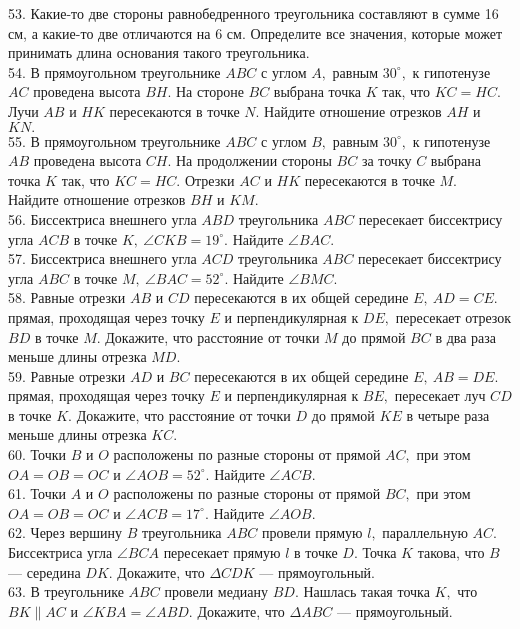 53. Какие-то две стороны равнобедренного треугольника составляют в сумме 16 см, а какие-то две отличаются на 6 см. Определите все значения, которые может принимать длина основания такого треугольника.\\
54. В прямоугольном треугольнике $ABC$ с углом $A,$ равным $30^\circ,$ к гипотенузе $AC$ проведена высота $BH.$ На стороне $BC$ выбрана точка $K$ так, что $KC=HC.$ Лучи $AB$ и $HK$ пересекаются в точке $N.$ Найдите отношение отрезков $AH$ и $KN.$\\
55.  В прямоугольном треугольнике $ABC$ с углом $B,$ равным $30^\circ,$ к гипотенузе $AB$ проведена высота $CH.$ На продолжении стороны $BC$ за точку $C$ выбрана точка $K$ так, что $KC=HC.$ Отрезки $AC$ и $HK$ пересекаются в точке $M.$ Найдите отношение отрезков $BH$ и $KM.$\\
56. Биссектриса внешнего угла $ABD$ треугольника $ABC$ пересекает биссектрису угла $ACB$ в точке $K,\ \angle CKB=19^\circ.$ Найдите $\angle BAC.$\\
57. Биссектриса внешнего угла $ACD$ треугольника $ABC$ пересекает биссектрису угла $ABC$ в точке $M,\ \angle BAC=52^\circ.$ Найдите $\angle BMC.$\\
58. Равные отрезки $AB$ и $CD$ пересекаются в их общей середине $E,\ AD=CE.$ прямая, проходящая через точку $E$ и перпендикулярная к $DE,$ пересекает отрезок $BD$ в точке $M.$ Докажите, что расстояние от точки $M$ до прямой $BC$ в два раза меньше длины отрезка $MD.$\\
59. Равные отрезки $AD$ и $BC$ пересекаются в их общей середине $E,\ AB=DE.$ прямая, проходящая через точку $E$ и перпендикулярная к $BE,$ пересекает луч $CD$ в точке $K.$ Докажите, что расстояние от точки $D$ до прямой $KE$ в четыре раза меньше длины отрезка $KC.$\\
60. Точки $B$ и $O$ расположены по разные стороны от прямой $AC,$ при этом  $OA=OB=OC$ и $\angle AOB = 52^\circ.$ Найдите $\angle ACB.$\\
61. Точки $A$ и $O$ расположены по разные стороны от прямой $BC,$ при этом  $OA=OB=OC$ и $\angle ACB= 17  ^\circ.$ Найдите $\angle AOB.$\\
62. Через вершину $B$ треугольника $ABC$ провели прямую $l,$ параллельную $AC.$ Биссектриса угла $\angle BCA$ пересекает прямую $l$ в точке $D.$ Точка $K$ такова, что $B$ --- середина $DK.$ Докажите, что $\Delta CDK$ --- прямоугольный.\\
63. В треугольнике $ABC$ провели медиану $BD.$ Нашлась такая точка $K,$ что $BK\parallel AC$ и $\angle KBA=\angle ABD.$ Докажите, что $\Delta ABC$ --- прямоугольный.\\
